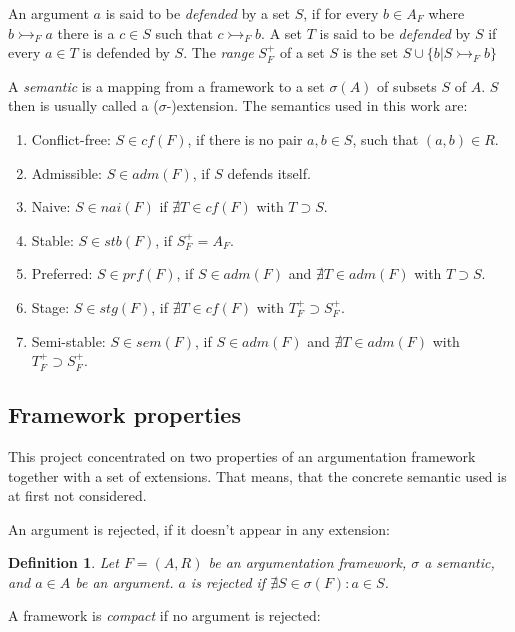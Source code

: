 \documentclass{scrartcl}
\newtheorem{definition}{Definition}
\begin{document}
An argument $a$ is said to be \emph{defended} by a set $S$, if for every $b \in
A_F$ where $b \rightarrowtail_F a$ there is a $c \in S$ such that $c
\rightarrowtail_F b$. A set $T$ is said to be \emph{defended} by $S$ if every
$a \in T$ is defended by $S$. The \emph{range} $S_F^{+}$ of a set $S$ is the
set $S \cup\{b | S \rightarrowtail_F b\}$

A \emph{semantic} is a mapping from a framework to a set $\sigma(A)$ of subsets
$S$ of $A$.  $S$ then is usually called a ($\sigma$-)extension. The semantics
used in this work are:
\begin{enumerate}
  \item Conflict-free: $S \in cf(F)$, if there is no pair $a,b \in S$, such that
      $(a,b) \in R$.
  \item Admissible: $S \in adm(F)$, if $S$ defends itself.
  \item Naive: $S \in nai(F)$ if $\nexists T\in cf(F)$ with $T \supset S$.
  \item Stable: $S \in stb(F)$, if $S_F^{+} = A_F$.
  \item Preferred: $S \in prf(F)$, if $S \in adm(F)$ and $\nexists T\in adm(F)$
      with $T \supset S$.
  \item Stage: $S \in stg(F)$, if $\nexists T\in cf(F)$ with $T_F^{+} \supset
      S_F^{+}$.
  \item Semi-stable: $S \in sem(F)$, if $S \in adm(F)$ and $\nexists T\in
      adm(F)$ with $T_F^{+} \supset S_F^{+}$.
\end{enumerate}

\subsection{Framework properties} \label{framework_props}

This project concentrated on two properties of an argumentation framework
together with a set of extensions. That means, that the concrete semantic used
is at first not considered.

An argument is rejected, if it doesn't appear in any extension:

\begin{definition}
Let $F=(A,R)$ be an argumentation framework, $\sigma$ a semantic, and $a\in A$
be an argument. $a$ is \emph{rejected} if $\nexists S\in\sigma(F): a\in S$.
\end{definition}

A framework is \emph{compact} if no argument is rejected:
\end{document}

